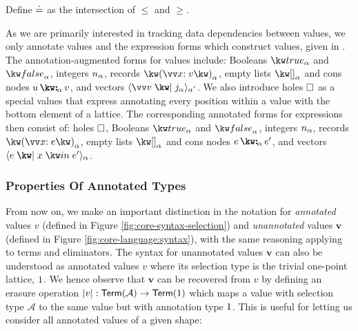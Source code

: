 \begin{definition}
   Define $\doteq$ as the intersection of $\leq$ and $\geq$.
\end{definition}




\noindent
As we are primarily interested in tracking data dependencies between values, we only annotate values and the expression forms which construct values, given in . The annotation-augmented forms for values include: Booleans $\annTrue{\alpha}$ and $\annFalse{\alpha}$, integers $n_{\alpha}$, records $\annRec{\vec{\bind{x}{v}}}{\alpha}$, empty lists $\annNil{\alpha}$ and cons nodes $\annCons{u}{v}{\alpha}$, and vectors $\annVecVal{\vec{v}}{\annInt{j}{\alpha}}{\smash{\alpha'}}$. We also introduce holes $\square$ as a special values that express annotating every position within a value with the bottom element of a lattice. The corresponding annotated forms for expressions then consist of: holes $\square$, Booleans $\annTrue{\alpha}$ and $\annFalse{\alpha}$, integers $n_{\alpha}$, records $\annRec{\vec{\bind{x}{e}}}{\alpha}$, empty lists $\annNil{\alpha}$ and cons nodes $\annCons{e}{e'}{\alpha}$, and vectors $\annVec{e}{x}{e'}{\alpha}$.


\subsubsection{Properties Of Annotated Types}

From now on, we make an important distinction in the notation for \textit{annotated} values $v$ (defined in Figure \ref{fig:core-syntax-selection}) and \textit{unannotated} values $\mathbf{v}$ (defined in Figure \ref{fig:core-language:syntax}), with the same reasoning applying to terms and eliminators. The syntax for unannotated values $\mathbf{v}$ can also be understood as annotated values $v$ where its selection type is the trivial one-point lattice, $\mathrm{1}$. We hence observe that $\mathbf{v}$ can be recovered from $v$ by defining an erasure operation $|v| : {\textup{\textsf{Term}}({\mathcal{A}})}\rightarrow{\textup{\textsf{Term}}({\mathrm{1}})}$ which maps a value with selection type $\mathcal{A}$ to the same value but with annotation type $\mathrm{1}$. This is useful for letting us consider all annotated values of a given shape:

